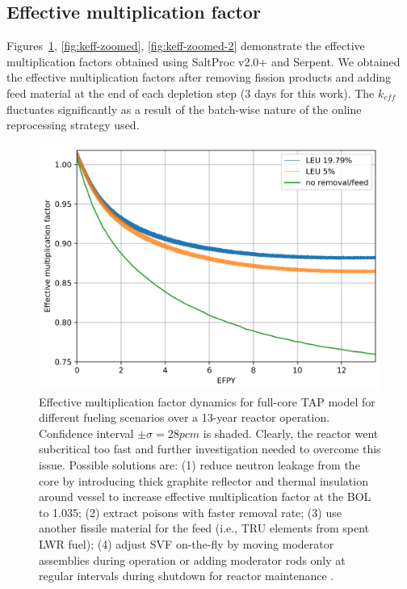 \documentclass[12pt]{article} %
\begin{document}
\subsection{Effective multiplication factor}
Figures~\ref{fig:keff}, \ref{fig:keff-zoomed}, \ref{fig:keff-zoomed-2} demonstrate 
the effective 
multiplication factors  obtained using SaltProc v2.0+ and Serpent. We obtained 
the effective multiplication factors after removing fission products 
and adding feed material at the end of each depletion step (3 days for this 
work). The $k_{eff}$ fluctuates significantly as a result of the batch-wise 
nature of the online reprocessing strategy used.
\begin{figure}[htp!] %
		  \includegraphics[width=1.05\textwidth]{keff_3.png}
	\vspace{-0.2in}
  \caption{Effective multiplication factor dynamics for full-core
   \gls{TAP} model for different fueling scenarios over a 13-year reactor operation. 
   Confidence interval $\pm\sigma=28pcm$ is shaded. Clearly, the reactor went 
   subcritical too fast and further investigation needed to overcome this issue. 
   Possible solutions are: (1) reduce neutron leakage from the core by 
   introducing thick graphite reflector and thermal insulation around 
   vessel to increase effective multiplication factor at the 
   \gls{BOL} to 1.035; (2) extract poisons with faster removal rate;
   (3) use another fissile material for the feed (i.e., \gls{TRU} elements from spent 
   \gls{LWR} fuel); (4) adjust \gls{SVF} on-the-fly by 
   moving moderator assemblies during operation 
   \cite{transatomic_power_corporation_technical_2016} or adding moderator rods 
   only at regular intervals during shutdown for reactor maintenance  \cite{betzler_fuel_2018}.}
  \label{fig:keff}
\end{figure}
\end{document}
